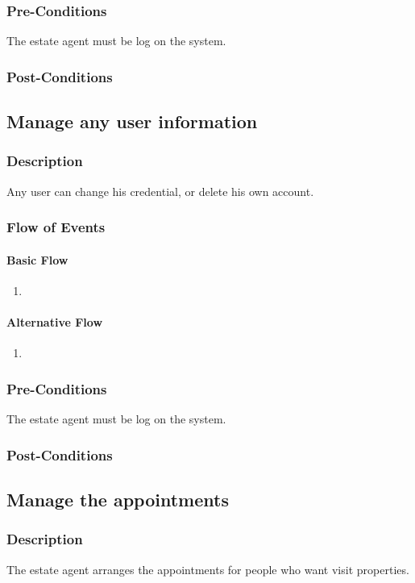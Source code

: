 \documentclass[a4paper,12pt]{article}
\begin{document}
\subsubsection{Pre-Conditions}
The estate agent must be log on the system.
\subsubsection{Post-Conditions}


\subsection{Manage any user information}
\subsubsection{Description}
Any user can change his credential, or delete his own account.
\subsubsection{Flow of Events}
\paragraph{Basic Flow}
\begin{enumerate}
\item
\end{enumerate}
\paragraph{Alternative Flow}
\begin{enumerate}
\item
\end{enumerate}
\subsubsection{Pre-Conditions}
The estate agent must be log on the system.
\subsubsection{Post-Conditions}

\subsection{Manage the appointments}
\subsubsection{Description}
The estate agent arranges the appointments for people who want visit properties.
\end{document}
